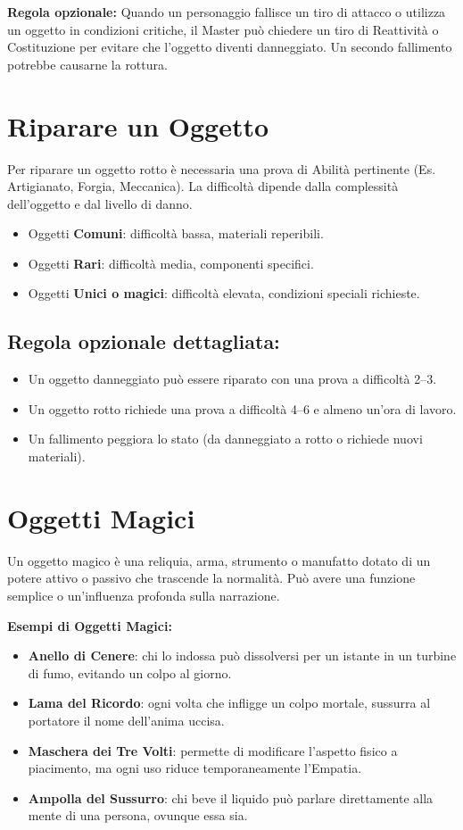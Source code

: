 \documentclass[../manuale_main.tex]{subfiles}
\begin{document}
\textbf{Regola opzionale:} Quando un personaggio fallisce un tiro di attacco o utilizza un oggetto in condizioni critiche, il Master può chiedere un tiro di Reattività o Costituzione per evitare che l’oggetto diventi danneggiato. Un secondo fallimento potrebbe causarne la rottura.

\section*{Riparare un Oggetto}

\noindent
Per riparare un oggetto rotto è necessaria una prova di Abilità pertinente (Es. Artigianato, Forgia, Meccanica). La difficoltà dipende dalla complessità dell’oggetto e dal livello di danno.

\begin{itemize}
  \item Oggetti \textbf{Comuni}: difficoltà bassa, materiali reperibili.
  \item Oggetti \textbf{Rari}: difficoltà media, componenti specifici.
  \item Oggetti \textbf{Unici o magici}: difficoltà elevata, condizioni speciali richieste.
\end{itemize}

\subsection*{Regola opzionale dettagliata:}
\begin{itemize}
  \item Un oggetto danneggiato può essere riparato con una prova a difficoltà 2--3.
  \item Un oggetto rotto richiede una prova a difficoltà 4--6 e almeno un’ora di lavoro.
  \item Un fallimento peggiora lo stato (da danneggiato a rotto o richiede nuovi materiali).
\end{itemize}

\section{Oggetti Magici}

Un oggetto magico è una reliquia, arma, strumento o manufatto dotato di un potere attivo o passivo che trascende la normalità. Può avere una funzione semplice o un’influenza profonda sulla narrazione.

\medskip
\textbf{Esempi di Oggetti Magici:}
\begin{itemize}
  \item \textbf{Anello di Cenere}: chi lo indossa può dissolversi per un istante in un turbine di fumo, evitando un colpo al giorno.
  \item \textbf{Lama del Ricordo}: ogni volta che infligge un colpo mortale, sussurra al portatore il nome dell’anima uccisa.
  \item \textbf{Maschera dei Tre Volti}: permette di modificare l’aspetto fisico a piacimento, ma ogni uso riduce temporaneamente l’Empatia.
  \item \textbf{Ampolla del Sussurro}: chi beve il liquido può parlare direttamente alla mente di una persona, ovunque essa sia.
\end{itemize}
\end{document}
